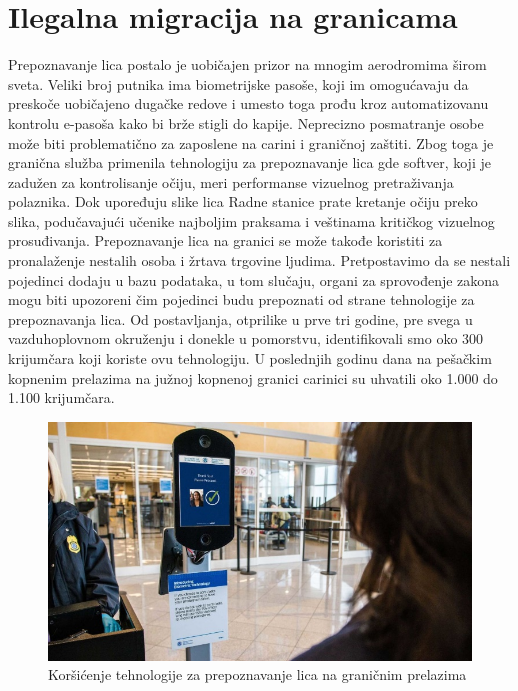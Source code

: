\documentclass[a4paper]{article}
\begin{document}
\section{Ilegalna migracija na granicama}
\label{sec:ilegalne migracije}
Prepoznavanje lica postalo je uobičajen prizor na mnogim aerodromima širom sveta. Veliki broj putnika ima biometrijske pasoše, koji im omogućavaju da preskoče uobičajeno dugačke redove i umesto toga prođu kroz automatizovanu kontrolu e-pasoša kako bi brže stigli do kapije.
Neprecizno posmatranje osobe može biti problematično za zaposlene na carini i graničnoj zaštiti. Zbog toga je granična služba primenila tehnologiju za prepoznavanje lica gde softver, koji je zadužen za kontrolisanje očiju, meri performanse vizuelnog pretraživanja polaznika. Dok upoređuju slike lica Radne stanice prate kretanje očiju preko slika, podučavajući učenike najboljim praksama i veštinama kritičkog vizuelnog prosuđivanja.\cite{ht208108}
Prepoznavanje lica na granici se može takođe koristiti za pronalaženje nestalih osoba i žrtava trgovine ljudima. Pretpostavimo da se nestali pojedinci dodaju u bazu podataka, u tom slučaju, organi za sprovođenje zakona mogu biti upozoreni čim pojedinci budu prepoznati od strane tehnologije za prepoznavanja lica.
Od postavljanja, otprilike u prve tri godine, pre svega u vazduhoplovnom okruženju i donekle u pomorstvu, identifikovali smo oko 300 krijumčara koji koriste ovu tehnologiju. U poslednjih godinu dana na pešačkim kopnenim prelazima na južnoj kopnenoj granici carinici su uhvatili oko 1.000 do 1.100 krijumčara.
\begin{figure}[h!]
	\begin{center}
		\includegraphics[scale=0.8]{image3.png}
	\end{center}
	\caption{Koršićenje tehnologije za prepoznavanje lica na graničnim prelazima}
\end{figure}
\end{document}
